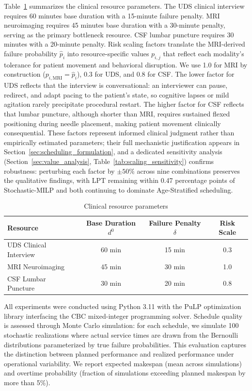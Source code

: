 \documentclass[11pt,a4paper]{article}
\begin{document}
Table~\ref{tab:resource_params} summarizes the clinical resource parameters. The UDS clinical interview requires 60 minutes base duration with a 15-minute failure penalty. MRI neuroimaging requires 45 minutes base duration with a 30-minute penalty, serving as the primary bottleneck resource. CSF lumbar puncture requires 30 minutes with a 20-minute penalty. Risk scaling factors translate the MRI-derived failure probability $\hat{p}_i$ into resource-specific values $p_{i,j}$ that reflect each modality's tolerance for patient movement and behavioral disruption. We use 1.0 for MRI by construction ($p_{i,\text{MRI}} = \hat{p}_i$), 0.3 for UDS, and 0.8 for CSF. The lower factor for UDS reflects that the interview is conversational: an interviewer can pause, redirect, and adapt pacing to the patient's state, so cognitive lapses or mild agitation rarely precipitate procedural restart. The higher factor for CSF reflects that lumbar puncture, although shorter than MRI, requires sustained flexed positioning during needle placement, making patient movement clinically consequential. These factors represent informed clinical judgment rather than empirically estimated parameters; their full mechanistic justification appears in Section~\ref{sec:scheduling_formulation}, and a dedicated sensitivity analysis (Section~\ref{sec:value_analysis}, Table~\ref{tab:scaling_sensitivity}) confirms robustness: perturbing each factor by $\pm 50\%$ across nine combinations preserves the qualitative findings, with LPT remaining within 0.47 percentage points of Stochastic-MILP and both continuing to dominate Age-Stratified scheduling.

\begin{table}[htbp]
\centering
\caption{Clinical resource parameters}
\label{tab:resource_params}
\begin{tabular}{@{}lccc@{}}
\toprule
\textbf{Resource} & \textbf{Base Duration} $d^0$ & \textbf{Failure Penalty} $\delta$ & \textbf{Risk Scale} \\
\midrule
UDS Clinical Interview & 60 min & 15 min & 0.3 \\
MRI Neuroimaging & 45 min & 30 min & 1.0 \\
CSF Lumbar Puncture & 30 min & 20 min & 0.8 \\
\bottomrule
\end{tabular}
\end{table}

All experiments were conducted using Python 3.11 with the PuLP optimization library interfacing the CBC mixed-integer programming solver. Schedule quality is assessed through Monte Carlo simulation: for each schedule, we simulate 100 stochastic realizations where actual service times are drawn from the Bernoulli distributions parameterized by true failure probabilities. This evaluation captures the distinction between planned performance and realized performance under operational variability. We report expected makespan (mean across simulations) and overtime probability (fraction of simulations exceeding planned makespan by more than 5\%).
\end{document}
